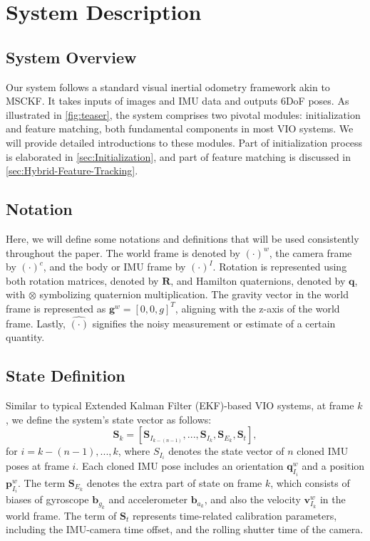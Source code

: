 \section{System Description}
\subsection{System Overview}
    Our system follows a standard visual inertial odometry framework akin to MSCKF\cite{wu2015square}. It takes inputs of images and IMU data and outputs 6DoF poses. As illustrated in \cref{fig:teaser}, the system comprises two pivotal modules: initialization and feature matching, both fundamental components in most VIO systems.
    We will provide detailed introductions to these modules. Part of initialization process is elaborated in \cref{sec:Initialization}, and part of feature matching is discussed in \cref{sec:Hybrid-Feature-Tracking}.
    
\subsection{Notation}
Here, we will define some notations and definitions that will be used consistently throughout the paper.
The world frame is denoted by $(\cdot)^w$, the camera frame by $(\cdot)^c$, and the body or IMU frame by $(\cdot)^I$. Rotation is represented using both rotation matrices, denoted by $\textbf{R}$, and Hamilton quaternions, denoted by $\textbf{q}$, with
$\otimes$ symbolizing quaternion multiplication. The gravity vector in the world frame is represented as
${\textbf{g}}^w = [0, 0, g]^T$, aligning with the z-axis of the world frame.
Lastly, $\hat{(\cdot)}$ signifies the noisy measurement or estimate of a certain quantity.

\subsection{State Definition}
  Similar to typical Extended Kalman Filter (EKF)-based VIO systems, at frame $k$, we define the system's state vector as follows:
  \begin{equation}
    {\textbf{S}_k} = [{\textbf{S}}_{I_{k-(n-1)}}, ... , {\textbf{S}}_{I_k}, {\textbf{S}}_{E_k}, {\textbf{S}}_{t}],
  \end{equation}
  for $i = k-(n-1), ...,k$, where ${S}_{I_i}$ denotes the state vector of $n$ cloned IMU poses at frame $i$. Each cloned IMU pose includes an orientation ${\textbf{q}}^w_{I_i}$ and a position   ${\textbf{p}}^w_{I_i}$. The term $\textbf{S}_{E_k}$ denotes the extra part of state on frame $k$, which consists of biases of gyroscope $\textbf{b}_{g_k}$ and accelerometer ${\textbf{b}}_{a_k}$, and also the velocity ${\textbf{v}}^w_{I_k}$ in the world frame. The term of ${\textbf{S}}_{t}$ represents time-related calibration parameters, including the IMU-camera time offset, and the rolling shutter time of the camera.


